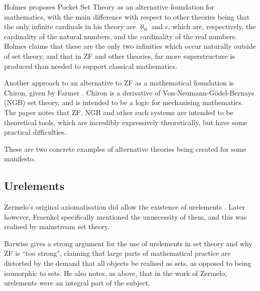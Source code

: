 \documentclass[11pt]{article}
\theoremstyle{definition}
\theoremstyle{theorem}
\theoremstyle{lemma}
\begin{document}
Holmes proposes Pocket Set Theory \cite{pocket} as an alternative foundation for mathematics, with the main difference with respect to other theories being that the only infinite cardinals in his theory are $\aleph_0$ and $c$, which are, respectively, the cardinality of the natural numbers, and the cardinality of the real numbers.
Holmes claims that these are the only two infinities which occur naturally outside of set theory, and that in ZF and other theories, far more superstructure is produced than needed to support classical mathematics.

Another approach to an alternative to ZF as a mathematical foundation is Chiron, given by Farmer \cite{chiron}. Chiron is a derivative of Von-Neumann-G\"odel-Bernays (NGB) set theory, and is intended to be a logic for mechanising mathematics. The paper notes that ZF, NGB and other such systems are intended to be theoretical tools, which are incredibly expressively theoretically, but have some practical difficulties.

These are two concrete examples of alternative theories being created for some manifesto.

\subsection{Urelements}
Zermelo's original axiomatisation did allow the existence of urelements \cite{zermelo}.
Later however, Fraenkel specifically mentioned the unnecessity of them, and this was realised by mainstream set theory.

Barwise \cite{barwise} gives a strong argument for the use of urelements in set theory and why ZF is ``too strong", claiming that large parts of mathematical practice are distorted by the demand that all objects be realised as sets, as opposed to being isomorphic to sets.
He also notes, as above, that in the work of Zermelo, urelements were an integral part of the subject.
\end{document}

